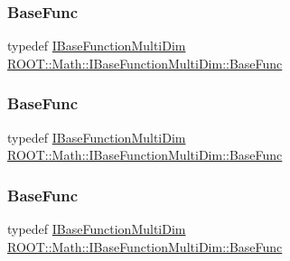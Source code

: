 \subsubsection{\texorpdfstring{BaseFunc}{BaseFunc}\hspace{0.1cm}{\footnotesize\ttfamily [1/3]}}
{\footnotesize\ttfamily typedef \mbox{\hyperlink{classROOT_1_1Math_1_1IBaseFunctionMultiDim}{I\+Base\+Function\+Multi\+Dim}} \mbox{\hyperlink{classROOT_1_1Math_1_1IBaseFunctionMultiDim_a44c87c3e8c23d140cc3bf067d6480070}{R\+O\+O\+T\+::\+Math\+::\+I\+Base\+Function\+Multi\+Dim\+::\+Base\+Func}}}

\mbox{\label{classROOT_1_1Math_1_1IBaseFunctionMultiDim_a44c87c3e8c23d140cc3bf067d6480070}} 
\subsubsection{\texorpdfstring{BaseFunc}{BaseFunc}\hspace{0.1cm}{\footnotesize\ttfamily [2/3]}}
{\footnotesize\ttfamily typedef \mbox{\hyperlink{classROOT_1_1Math_1_1IBaseFunctionMultiDim}{I\+Base\+Function\+Multi\+Dim}} \mbox{\hyperlink{classROOT_1_1Math_1_1IBaseFunctionMultiDim_a44c87c3e8c23d140cc3bf067d6480070}{R\+O\+O\+T\+::\+Math\+::\+I\+Base\+Function\+Multi\+Dim\+::\+Base\+Func}}}

\mbox{\label{classROOT_1_1Math_1_1IBaseFunctionMultiDim_a44c87c3e8c23d140cc3bf067d6480070}} 
\subsubsection{\texorpdfstring{BaseFunc}{BaseFunc}\hspace{0.1cm}{\footnotesize\ttfamily [3/3]}}
{\footnotesize\ttfamily typedef \mbox{\hyperlink{classROOT_1_1Math_1_1IBaseFunctionMultiDim}{I\+Base\+Function\+Multi\+Dim}} \mbox{\hyperlink{classROOT_1_1Math_1_1IBaseFunctionMultiDim_a44c87c3e8c23d140cc3bf067d6480070}{R\+O\+O\+T\+::\+Math\+::\+I\+Base\+Function\+Multi\+Dim\+::\+Base\+Func}}}



